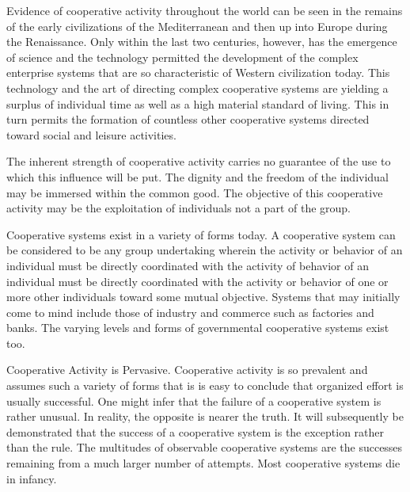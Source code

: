 Evidence of cooperative activity throughout the world can be seen in the remains of the early civilizations of the Mediterranean and then up into Europe during the Renaissance. Only within the last two centuries, however, has the emergence of science and the technology permitted the development of the complex enterprise systems that are so characteristic of Western civilization today. This technology and the art of directing complex cooperative systems are yielding a surplus of individual time as well as a high material standard of living. This in turn permits the formation of countless other cooperative systems directed toward social and leisure activities.

The inherent strength of cooperative activity carries no guarantee of the use to which this influence will be put. The dignity and the freedom of the individual may be immersed within the common good. The objective of this cooperative activity may be the exploitation of individuals not a part of the group.

Cooperative systems exist in a variety of forms today. A cooperative system can be considered to be any group undertaking wherein the activity or behavior of an individual must be directly coordinated with the activity of behavior of an individual must be directly coordinated with the activity or behavior of one or more other individuals toward some mutual objective. Systems that may initially come to mind include those of industry and commerce such as factories and banks. The varying levels and forms of governmental cooperative systems exist too.

Cooperative Activity is Pervasive. Cooperative activity is so prevalent and assumes such a variety of forms that is is easy to conclude that organized effort is usually successful. One might infer that the failure of a cooperative system is rather unusual. In reality, the opposite is nearer the truth. It will subsequently be demonstrated that the success of a cooperative system is the exception rather than the rule. The multitudes of observable cooperative systems are the successes remaining from a much larger number of attempts. Most cooperative systems die in infancy.

